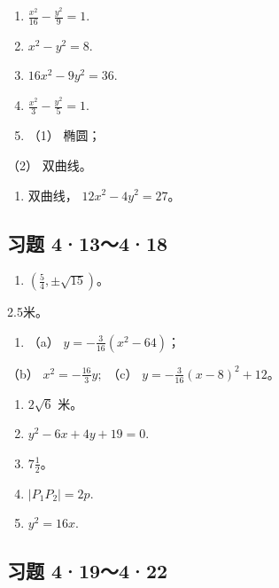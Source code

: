 \begin{enumerate}
\def\labelenumi{\arabic{enumi}.}
\setcounter{enumi}{2}
\item
  \(\frac{x^2}{16} -\frac{y^2}{9} = 1.\)
\item
  \(x^{2} - y^{2} = 8.\)
\item
  \(16x^{2} - 9y^{2} = 36.\)
\item
  \(\frac{x^2}{3} -\frac{y^2}{5} = 1.\)
\item
  （1） 椭圆；
\end{enumerate}

（2） 双曲线。

\begin{enumerate}
\def\labelenumi{\arabic{enumi}.}
\setcounter{enumi}{7}
\tightlist
\item
  双曲线， \(12x^{2}-4y^{2}=27\)。
\end{enumerate}

\subsection{习题 4·13～4·18}\label{ux4e60ux9898-413418}

\begin{enumerate}
\def\labelenumi{\arabic{enumi}.}
\tightlist
\item
  \(\left(\frac{5}{4}, \pm \sqrt{15}\right)\)。
\end{enumerate}

2.5米。

\begin{enumerate}
\def\labelenumi{\arabic{enumi}.}
\setcounter{enumi}{2}
\tightlist
\item
  （a） \(y = -\frac{3}{16} (x^2 - 64)\)；
\end{enumerate}

（b） \(x^{2} = -\frac{16}{3} y;\) （c）
\(y = -\frac{3}{16} (x - 8)^2 + 12\)。

\begin{enumerate}
\def\labelenumi{\arabic{enumi}.}
\setcounter{enumi}{3}
\item
  \(2\sqrt{6}\) 米。
\item
  \(y^{2} - 6x + 4y + 19 = 0.\)
\item
  \(7 \frac{1}{2}\)。
\item
  \(|P_{1}P_{2}| = 2p.\)
\item
  \(y^{2} = 16x.\)
\end{enumerate}

\subsection{习题 4·19～4·22}\label{ux4e60ux9898-419422}

